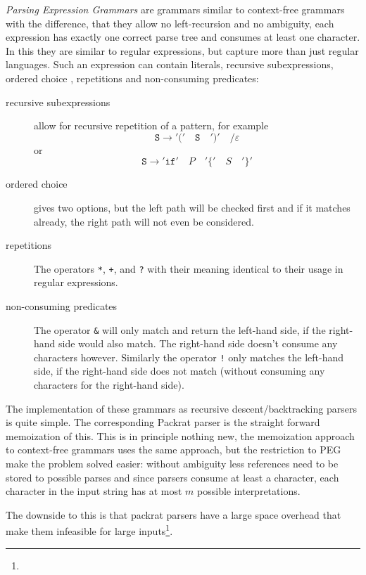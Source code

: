 \documentclass[11pt]{Thesis}
\theoremstyle{definition}
\begin{document}
\emph{Parsing Expression Grammars} are grammars similar to context-free 
grammars with the difference, that they allow no left-recursion and no
ambiguity, each expression has exactly one correct parse tree and consumes at 
least one character. In this they are similar to regular expressions, but
capture more than just regular languages.  Such an expression can contain
literals, recursive subexpressions, ordered choice , repetitions and
non-consuming predicates:

\begin{description}
  \item[recursive subexpressions] allow for recursive repetition of a 
    pattern, for example 
    \[\mathtt{S} \rightarrow \mathtt{'('}\quad \mathtt{S}\quad \mathtt{')'}\quad \mathtt{/} \varepsilon \]
    or
    \[ \mathtt{S} \rightarrow \mathtt{'if'}\quad P\quad \mathtt{'\{'}\quad S\quad \mathtt{'\}'}\]
  \item[ordered choice] gives two options, but the left path will be checked 
    first and if it matches already, the right path will not even be considered.
  \item[repetitions] The operators \texttt{*}, \texttt{+}, and \texttt{?} 
    with their meaning identical to their usage in regular expressions.
  \item[non-consuming predicates] The operator \texttt{\&} will only match and 
    return the left-hand side, if the right-hand side would also match. The 
    right-hand side doesn't consume any characters however. Similarly the 
    operator \texttt{!} only matches the left-hand side, if the right-hand 
    side does not match (without consuming any characters for the right-hand side).
\end{description}

The implementation of these grammars as recursive descent/backtracking 
parsers is quite simple. The corresponding Packrat parser is the straight
forward memoization of this. This is in principle nothing new, the 
memoization approach to context-free grammars uses the same approach, but the 
restriction to PEG make the problem solved easier: without ambiguity less 
references need to be stored to possible parses and since parsers consume at 
least a character, each character in the input string has at most $m$ 
possible interpretations.

The downside to this is that packrat parsers have a large space overhead that 
make them infeasible for large 
inputs\cite{Beck08a}\footnote{}.
\end{document}
